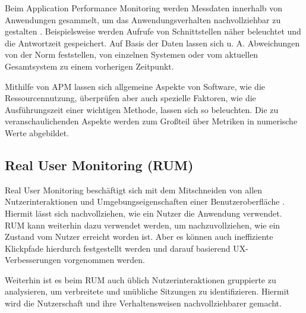 Beim Application Performance Monitoring werden Messdaten innerhalb von Anwendungen gesammelt, um das Anwendungsverhalten nachvollziehbar zu gestalten \cite{StudyingTheEffectivenessOfAPMTools}. Beispielsweise werden Aufrufe von Schnittstellen näher beleuchtet und die Antwortzeit gespeichert. Auf Basis der Daten lassen sich u. A. Abweichungen von der Norm feststellen, von einzelnen Systemen oder vom aktuellen Gesamtsystem zu einem vorherigen Zeitpunkt.

Mithilfe von APM lassen sich allgemeine Aspekte von Software, wie die Ressourcennutzung, überprüfen aber auch spezielle Faktoren, wie die Ausführungszeit einer wichtigen Methode, lassen sich so beleuchten. Die zu veranschaulichenden Aspekte werden zum Großteil über Metriken in numerische Werte abgebildet.

\subsection{Real User Monitoring (RUM)}


Real User Monitoring beschäftigt sich mit dem Mitschneiden von allen Nutzerinteraktionen und Umgebungseigenschaften einer Benutzeroberfläche \cite{IdentifyingWebPerformanceDegradations}. Hiermit lässt sich nachvollziehen, wie ein Nutzer die Anwendung verwendet. RUM kann weiterhin dazu verwendet werden, um nachzuvollziehen, wie ein Zustand vom Nutzer erreicht worden ist. Aber es können auch ineffiziente Klickpfade hierdurch festgestellt werden und darauf basierend UX-Verbesserungen vorgenommen werden.

Weiterhin ist es beim RUM auch üblich Nutzerinteraktionen gruppierte zu analysieren, um verbreitete und unübliche Sitzungen zu identifizieren. Hiermit wird die Nutzerschaft und ihre Verhaltensweisen nachvollziehbarer gemacht.

%


